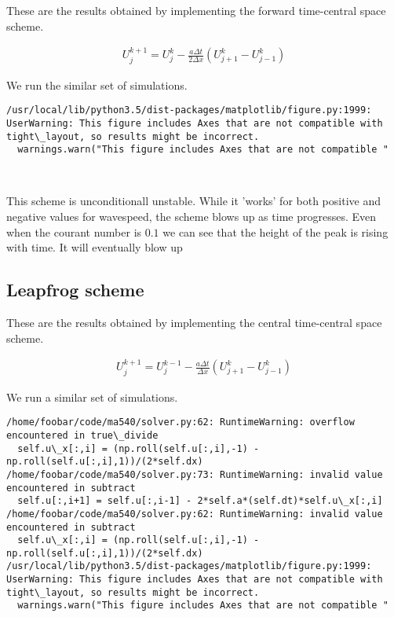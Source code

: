 \documentclass[11pt]{article}
\begin{document}
These are the results obtained by implementing the forward time-central
space scheme.

\begin{align}
U_j^{k+1} = U_j^k - \frac{a \Delta t}{2 \Delta x}\left( U_{j+1}^k - U_{j-1}^k\right)
\end{align}

We run the similar set of simulations.

    \begin{Verbatim}[commandchars=\\\{\}]
/usr/local/lib/python3.5/dist-packages/matplotlib/figure.py:1999: UserWarning: This figure includes Axes that are not compatible with tight\_layout, so results might be incorrect.
  warnings.warn("This figure includes Axes that are not compatible "

    \end{Verbatim}

    \begin{center}
    \end{center}
    { \hspace*{\fill} \\}
    
    This scheme is unconditionall unstable. While it 'works' for both
positive and negative values for wavespeed, the scheme blows up as time
progresses. Even when the courant number is \(0.1\) we can see that the
height of the peak is rising with time. It will eventually blow up

    \subsection{Leapfrog scheme}\label{leapfrog-scheme}

These are the results obtained by implementing the central time-central
space scheme.

\begin{align}
U_j^{k+1} = U_j^{k-1} - \frac{a \Delta t}{\Delta x}\left( U_{j+1}^k - U_{j-1}^k\right)
\end{align}

We run a similar set of simulations.

    \begin{Verbatim}[commandchars=\\\{\}]
/home/foobar/code/ma540/solver.py:62: RuntimeWarning: overflow encountered in true\_divide
  self.u\_x[:,i] = (np.roll(self.u[:,i],-1) - np.roll(self.u[:,i],1))/(2*self.dx)
/home/foobar/code/ma540/solver.py:73: RuntimeWarning: invalid value encountered in subtract
  self.u[:,i+1] = self.u[:,i-1] - 2*self.a*(self.dt)*self.u\_x[:,i]
/home/foobar/code/ma540/solver.py:62: RuntimeWarning: invalid value encountered in subtract
  self.u\_x[:,i] = (np.roll(self.u[:,i],-1) - np.roll(self.u[:,i],1))/(2*self.dx)
/usr/local/lib/python3.5/dist-packages/matplotlib/figure.py:1999: UserWarning: This figure includes Axes that are not compatible with tight\_layout, so results might be incorrect.
  warnings.warn("This figure includes Axes that are not compatible "

    \end{Verbatim}
\end{document}

